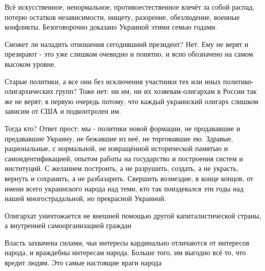 Всё искусственное, ненормальное, противоестественное влечёт за собой распад,
потерю остатков независимости, нищету, разорение, обезлюдение, военные
конфликты. Безоговорочно доказано Украиной этими семью годами.  

Сможет ли наладить отношения сегодняшний президент? Нет. Ему не верят и
презирают - это уже слишком очевидно и понятно, и ясно обозначено на самом
высоком уровне. 

Старые политики, а все они без исключения участники тех или иных
политико-олигархических групп? Тоже нет: ни им, ни их хозяевам-олигархам в
России так же не верят; в первую очередь потому, что каждый украинский олигарх
слишком зависим от США и подконтролен им. 

Тогда кто? Ответ прост: мы - политики новой формации, не продававшие и
предававшие Украину, не бежавшие из неё, не торговавшие ею. Здравые,
рациональные, с нормальной, не извращённой исторической памятью и
самоидентификацией, опытом работы на государство и построения систем и
институций. С желанием построить, а не разрушить, создать, а не украсть,
вернуть и сохранить, а не разбазарить. Свершить возмездие, в конце концов, от
имени всего украинского народа над теми, кто так поиздевался эти годы над нашей
многострадальной, но прекрасной Украиной.

\begin{center}
	\begin{fminipage}{0.9\textwidth}
\Large\em\bfseries\color{orange}

Олигархат уничтожается не внешней помощью другой капиталистической страны, а
внутренней самоорганизацией граждан


Власть захвачена силами, чьи интересы кардинально отличаются от интересов
народа, и враждебны интересам народа. Больше того, им выгодно всё то, что
вредит людям. Это самые настоящие враги народа
	\end{fminipage}
\end{center}

